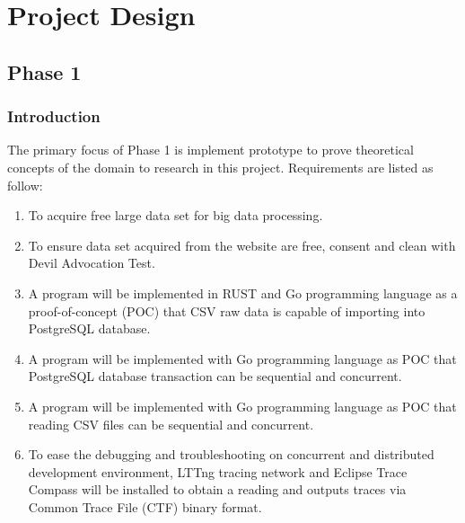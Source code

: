 \chapter{Project Design} 

\label{Chapter3} 


\doublespacing



\section{Phase 1}


\subsection{Introduction}
The primary focus of Phase 1 is implement prototype to prove theoretical concepts of the domain to research in this project. Requirements are listed as follow:

\begin{enumerate}[topsep=0pt,itemsep=-1ex,partopsep=1ex,parsep=1.5ex]

\item To acquire free large data set for big data processing.
\item To ensure data set acquired from the website are free, consent and clean with Devil Advocation Test. 
\item A program will be implemented in RUST and Go programming language as a proof-of-concept (POC) that CSV raw data is capable of importing into PostgreSQL database.
\item A program will be implemented with Go programming language as POC that PostgreSQL database transaction can be sequential and concurrent.
\item A program will be implemented with Go programming language as POC that reading CSV files can be sequential and concurrent.
\item To ease the debugging and troubleshooting on concurrent and distributed development environment, LTTng tracing network and Eclipse Trace Compass will be installed to obtain a reading and outputs traces via Common Trace File (CTF) binary format. 

\end{enumerate}

